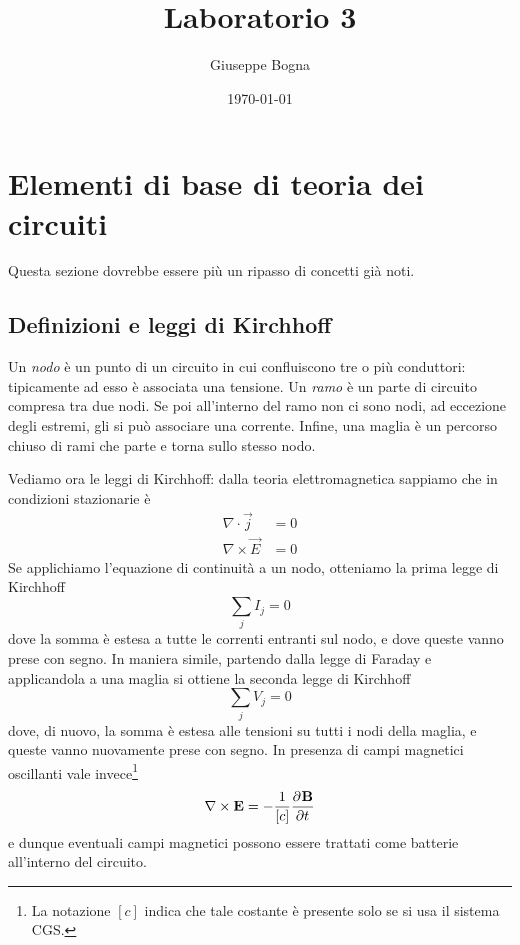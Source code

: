 \documentclass[a4paper, 11pt]{article}
\title{Laboratorio 3}
\author{Giuseppe Bogna}
\date{\today}
\begin{document}
	\maketitle
	\tableofcontents
	\newpage
	\section{Elementi di base di teoria dei circuiti}
	Questa sezione dovrebbe essere più un ripasso di concetti già noti. 
	\subsection{Definizioni e leggi di Kirchhoff}
	Un \emph{nodo} è un punto di un circuito in cui confluiscono tre o più conduttori: tipicamente ad esso è associata una tensione. Un \emph{ramo} è un parte di circuito compresa tra due nodi. Se poi all'interno del ramo non ci sono nodi, ad eccezione degli estremi, gli si può associare una corrente. Infine, una maglia è un percorso chiuso di rami che parte e torna sullo stesso nodo.
	
	Vediamo ora le leggi di Kirchhoff: dalla teoria elettromagnetica sappiamo che in condizioni stazionarie è
	\begin{align*}
		\nabla\cdot\vec j&=0\\\nabla\times\vec{E}&=0
	\end{align*}
	Se applichiamo l'equazione di continuità a un nodo, otteniamo la prima legge di Kirchhoff
	\[\sum_j I_j=0\]
	dove la somma è estesa a tutte le correnti entranti sul nodo, e dove queste vanno prese con segno. In maniera simile, partendo dalla legge di Faraday e applicandola a una maglia si ottiene la seconda legge di Kirchhoff
	\[\sum_{j}V_j=0\]
	dove, di nuovo, la somma è estesa alle tensioni su tutti i nodi della maglia, e queste vanno nuovamente prese con segno. In presenza di campi magnetici oscillanti vale invece\footnote{La notazione $[c]$ indica che tale costante è presente solo se si usa il sistema CGS.}
	\[\nabla\times\vec{E}=-\frac{1}{[c]}\pder{\vec{B}}{t}\]
	e dunque eventuali campi magnetici possono essere trattati come batterie all'interno del circuito.
\end{document}
